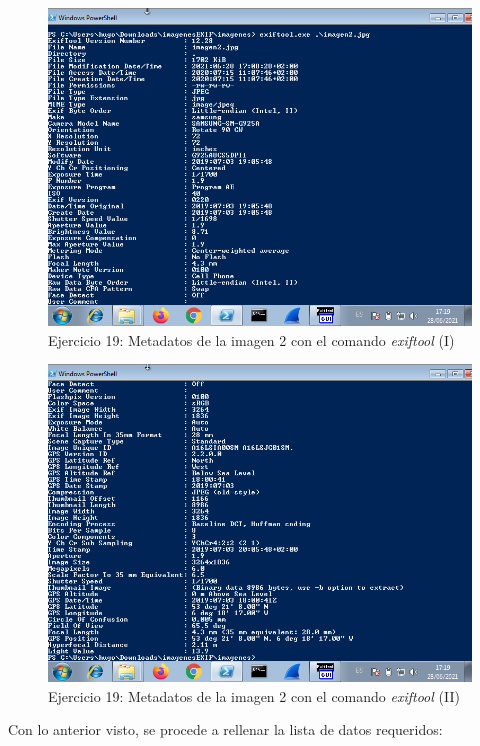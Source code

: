 \documentclass[11pt]{article}
\begin{document}
\begin{figure}[H]
    \caption{Ejercicio 19: Metadatos de la imagen 2 con el comando \textit{exiftool} (I)}
    \centering
    \includegraphics[scale=0.7]{p03/e19-5.png}
\end{figure}

\begin{figure}[H]
    \caption{Ejercicio 19: Metadatos de la imagen 2 con el comando \textit{exiftool} (II)}
    \centering
    \includegraphics[scale=0.7]{p03/e19-6.png}
\end{figure}

Con lo anterior visto, se procede a rellenar la lista de datos requeridos:
\end{document}
